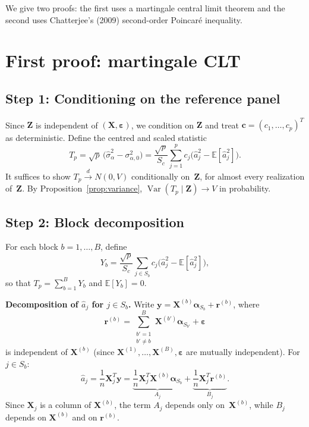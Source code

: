 \documentclass[11pt]{article}
\newcommand{\E}{\mathbb{E}}
\newcommand{\Var}{\operatorname{Var}}
\newcommand{\X}{\bm{X}}
\newcommand{\Z}{\bm{Z}}
\newcommand{\y}{\bm{y}}
\newcommand{\bal}{\bm{\alpha}}
\newcommand{\beps}{\bm{\varepsilon}}
\newcommand{\br}{\bm{r}}
\newcommand{\bc}{\bm{c}}
\begin{document}
We give two proofs: the first uses a martingale central limit theorem and the
second uses Chatterjee's (2009) second-order Poincar\'e inequality.

\section{First proof: martingale CLT}\label{sec:mCLT}

\subsection*{Step 1: Conditioning on the reference panel}

Since $\Z$ is independent of $(\X,\beps)$, we condition on $\Z$ and treat
$\bc=(c_1,\dots,c_p)^{T}$ as deterministic.  Define the centred and scaled
statistic
\begin{equation}\label{eq:Tp}
  T_p
  = \sqrt{p}\,\bigl(\hat\sigma_\alpha^{2}-\sigma_{\alpha,0}^{2}\bigr)
  = \frac{\sqrt{p}}{S_c}\sum_{j=1}^{p}c_j
    \bigl(\hat{a}_j^{2}-\E[\hat{a}_j^{2}]\bigr).
\end{equation}
It suffices to show $T_p\xrightarrow{d}N(0,V)$ conditionally on~$\Z$,
for almost every realization of~$\Z$.  By Proposition~\ref{prop:variance},
$\Var(T_p\mid\Z)\to V$ in probability.

\subsection*{Step 2: Block decomposition}

For each block $b=1,\dots,B$, define
\begin{equation}\label{eq:Yb}
  Y_b
  = \frac{\sqrt{p}}{S_c}\sum_{j\in S_b}c_j
    \bigl(\hat{a}_j^{2}-\E[\hat{a}_j^{2}]\bigr),
\end{equation}
so that $T_p=\sum_{b=1}^{B}Y_b$ and $\E[Y_b]=0$.

\medskip
\noindent\textbf{Decomposition of $\hat{a}_j$ for $j\in S_b$.}\;
Write $\y=\X^{(b)}\bal_{S_b}+\br^{(b)}$, where
\begin{equation}\label{eq:rb}
  \br^{(b)}
  = \sum_{\substack{b'=1\\b'\ne b}}^{B}\X^{(b')}\bal_{S_{b'}}+\beps
\end{equation}
is independent of $\X^{(b)}$ (since $\X^{(1)},\dots,\X^{(B)},\beps$ are
mutually independent).  For $j\in S_b$:
\begin{equation}\label{eq:aj_decomp}
  \hat{a}_j
  = \frac{1}{n}\X_j^{T}\y
  = \underbrace{\frac{1}{n}\X_j^{T}\X^{(b)}\bal_{S_b}}_{A_j}
    + \underbrace{\frac{1}{n}\X_j^{T}\br^{(b)}}_{B_j}.
\end{equation}
Since $\X_j$ is a column of $\X^{(b)}$, the term $A_j$ depends only
on~$\X^{(b)}$, while $B_j$ depends on $\X^{(b)}$ and on $\br^{(b)}$.
\end{document}
